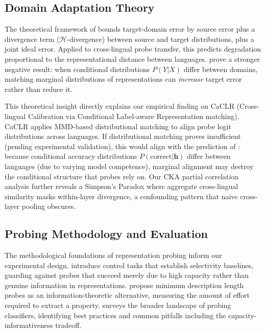 \subsection{Domain Adaptation Theory}

The theoretical framework of \citet{bendavid2010theory} bounds target-domain error by source error plus a divergence term ($\mathcal{H}$-divergence) between source and target distributions, plus a joint ideal error. Applied to cross-lingual probe transfer, this predicts degradation proportional to the representational distance between languages. \citet{zhao2019invariant} prove a stronger negative result: when conditional distributions $P(Y|X)$ differ between domains, matching marginal distributions of representations can \emph{increase} target error rather than reduce it.

This theoretical insight directly explains our empirical finding on CaCLR (Cross-lingual Calibration via Conditional Label-aware Representation matching). CaCLR applies MMD-based distributional matching to align probe logit distributions across languages. If distributional matching proves insufficient (pending experimental validation), this would align with the prediction of \citet{zhao2019invariant}: because conditional accuracy distributions $P(\text{correct}|\mathbf{h})$ differ between languages (due to varying model competence), marginal alignment may destroy the conditional structure that probes rely on. Our CKA partial correlation analysis further reveals a Simpson's Paradox where aggregate cross-lingual similarity masks within-layer divergence, a confounding pattern that naive cross-layer pooling obscures.

\subsection{Probing Methodology and Evaluation}

The methodological foundations of representation probing inform our experimental design. \citet{hewitt2019control} introduce control tasks that establish selectivity baselines, guarding against probes that succeed merely due to high capacity rather than genuine information in representations. \citet{voita2020mdl} propose minimum description length probes as an information-theoretic alternative, measuring the amount of effort required to extract a property. \citet{belinkov2022probing} surveys the broader landscape of probing classifiers, identifying best practices and common pitfalls including the capacity-informativeness tradeoff.

